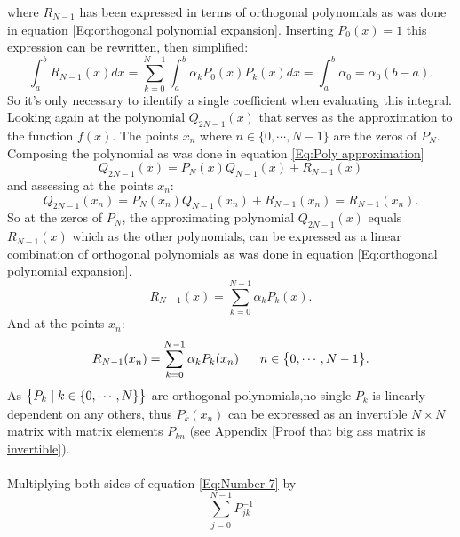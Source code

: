 \documentclass[10pt,a4paper]{article}
\begin{document}
where $R_{N-1}$ has been expressed in terms of orthogonal polynomials as was done in equation \ref{Eq:orthogonal polynomial expansion}.
Inserting $P_0(x) = 1$ this expression can be rewritten, then simplified:
\begin{equation}\label{Eq: integral as a function of a0}
\int_{a}^bR_{N-1}(x)dx = \sum\limits_{k=0}^{N-1}  \int_{a}^b \alpha_kP_0(x) P_k(x)dx = \int_{a}^b \alpha_0 = \alpha_0(b-a).
\end{equation}
So it's only necessary to identify a single coefficient when evaluating this integral.\\Looking again at the polynomial $Q_{2N-1}(x)$ that serves as the approximation to the function $f(x)$. The points $x_n$ where $n \in \big\{0,\cdots,N-1\big\}$ are the zeros of $P_N$. Composing the polynomial as was done in equation \ref{Eq:Poly approximation}
\begin{equation*}
Q_{2N-1}(x) = P_N(x)Q_{N-1}(x)+R_{N-1}(x)
\end{equation*}
and assessing at the points $x_n$:
\begin{equation}\label{Eq:Q2n_1 and Rn_1}
Q_{2N-1}(x_n) = P_N(x_n)Q_{N-1}(x_n)+R_{N-1}(x_n) = R_{N-1}(x_n).
\end{equation}
So at the zeros of $P_N$, the approximating polynomial $Q_{2N-1}(x)$ equals $R_{N-1}(x)$ which as the other polynomials, can be expressed as a linear combination of orthogonal polynomials as was done in equation \ref{Eq:orthogonal polynomial expansion}.
\begin{equation*}
R_{N-1}(x) = \sum\limits_{k=0}^{N-1} \alpha_k P_k(x).
\end{equation*} 
And at the points $x_n$:
\begin{equation}\label{Eq:Number 7}
R_{N-1}(x_n) = \sum\limits_{k=0}^{N-1} \alpha_k P_k(x_n)\hspace{6mm}n \in \big\{0,\cdots,N-1\big\}.
\end{equation}
As $\big\{ P_k\hspace{1mm}|\hspace{1mm} k \in \{0,\cdots,N\} \big\}$ are orthogonal polynomials,no single $P_k$ is linearly dependent on any others, thus $P_k(x_n)$ can be expressed as an invertible $N\times N$ matrix with matrix elements $P_{kn}$ (see Appendix \ref{Proof that big ass matrix is invertible}).\\\\Multiplying both sides of equation \ref{Eq:Number 7} by 
\begin{equation}
\sum\limits_{j=0}^{N-1}P_{jk}^{-1}
\end{equation}
\end{document}

